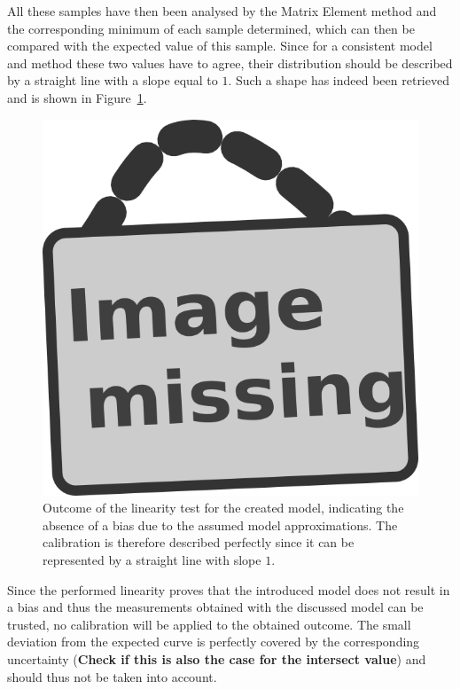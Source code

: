All these samples have then been analysed by the Matrix Element method and the corresponding minimum of each sample determined, which can then be compared with the expected value of this sample.
Since for a consistent model and method these two values have to agree, their distribution should be described by a straight line with a slope equal to $1$. Such a shape has indeed been retrieved and is shown in Figure~\ref{fig::CalibCurve}. 
\begin{figure}[h!t]
 \centering
 \includegraphics[width = 0.5 \textwidth]{image.png}
 \caption{Outcome of the linearity test for the created model, indicating the absence of a bias due to the assumed model approximations. The calibration is therefore described perfectly since it can be represented by a straight line with slope $1$.} \label{fig::CalibCurve}
\end{figure}

Since the performed linearity proves that the introduced model does not result in a bias and thus the measurements obtained with the discussed model can be trusted, no calibration will be applied to the obtained outcome. The small deviation from the expected curve is perfectly covered by the corresponding uncertainty (\textbf{Check if this is also the case for the intersect value}) and should thus not be taken into account.


